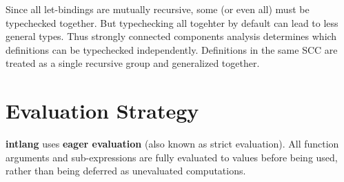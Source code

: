 \documentclass[12pt]{article}
\begin{document}
Since all let-bindings are mutually recursive, some (or even all) must be typechecked together. But typechecking all togehter by default can lead to less general types. Thus strongly connected components analysis determines which definitions can be typechecked independently. Definitions in the same SCC are treated as a single recursive group and generalized together.

\section{Evaluation Strategy}

\textbf{intlang} uses \textbf{eager evaluation} (also known as strict evaluation). 
All function arguments and sub-expressions are fully evaluated to values before being used, 
rather than being deferred as unevaluated computations.
\end{document}
